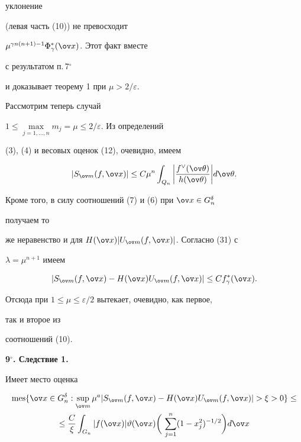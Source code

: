 уклонение 


(левая часть (10)) не превосходит 


$\mu^{\gamma n(n+1)-1}\Phi^*_\gamma(\ov x)$. Этот факт вместе 


с результатом п.\,7${}^\circ$ 


и доказывает теорему 1 при $\mu>2/\varepsilon$. 


 


Рассмотрим теперь случай 


$1\le\max\limits_{j=1,\dotsc,n}m_j=\mu\le2/\varepsilon$. Из определений 


(3), (4) и весовых оценок (12), очевидно, имеем 


$$ 


|S_{\ov m}(f,\ov x)|\le C\mu^n\int_{Q_n} 


\bigg|\frac{f^\vee(\ov\theta)}{h(\ov\theta)}\bigg| 


d\ov\theta. 


$$ 


Кроме того, в силу соотношений (7) и (6) при $\ov x\in G^\delta_n$ 


получаем то 


же неравенство и для $H(\ov x)|U_{\ov m}(f,\ov x)|$. Согласно (31) с 


$\lambda=\mu^{n+1}$ имеем 


$$ 


|S_{\ov m}(f,\ov x)-H(\ov x)U_{\ov m}(f,\ov x)|\le 


C f^*_\gamma(\ov x). 


$$ 


Отсюда при $1\le\mu\le\varepsilon/2$ вытекает, очевидно, как первое, 


так и второе из 


соотношений (10). 


\medskip 


 


 


{\bf 9${}^\circ$. Следствие 1.}  


Имеет место оценка 


\begin{multline} 


\mes\{\ov x\in G^\delta_n:\sup_{\ov m}\mu^a 


|S_{\ov m}(f,\ov x)-H(\ov x)U_{\ov m}(f,\ov x)|>\xi>0\}\le \\


%


\le\frac{C}{\xi}\int_{G_n}|f(\ov x)|\vartheta(\ov x) 


\bigg(\,\sum^n_{j=1}(1-x^2_j)^{-1/2}\bigg)d\ov x 


\end{multline} 



